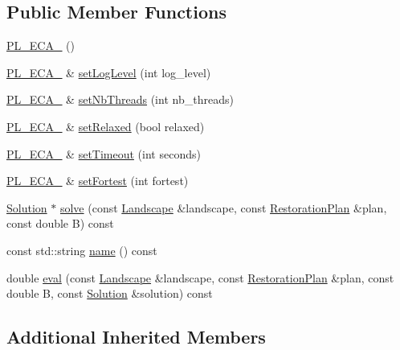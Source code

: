 \subsection*{Public Member Functions}
\begin{DoxyCompactItemize}
\item 
\hyperlink{class_solvers_1_1_p_l___e_c_a__3_a9af5b2a3a8f0df9de16a23781d56066a}{P\+L\+\_\+\+E\+C\+A\+\_} ()
\item 
\hyperlink{class_solvers_1_1_p_l___e_c_a__3}{P\+L\+\_\+\+E\+C\+A\+\_} \& \hyperlink{class_solvers_1_1_p_l___e_c_a__3_a009037ee169b9b0f372a85925274eaba}{set\+Log\+Level} (int log\+\_\+level)
\item 
\hyperlink{class_solvers_1_1_p_l___e_c_a__3}{P\+L\+\_\+\+E\+C\+A\+\_} \& \hyperlink{class_solvers_1_1_p_l___e_c_a__3_a112c187ccdabdc24bb7f9bf670ece7e1}{set\+Nb\+Threads} (int nb\+\_\+threads)
\item 
\hyperlink{class_solvers_1_1_p_l___e_c_a__3}{P\+L\+\_\+\+E\+C\+A\+\_} \& \hyperlink{class_solvers_1_1_p_l___e_c_a__3_af7951a4d24d7d85d2c0dc640fb436d41}{set\+Relaxed} (bool relaxed)
\item 
\hyperlink{class_solvers_1_1_p_l___e_c_a__3}{P\+L\+\_\+\+E\+C\+A\+\_} \& \hyperlink{class_solvers_1_1_p_l___e_c_a__3_a3f39771900d4abb806836b08373c005c}{set\+Timeout} (int seconds)
\item 
\hyperlink{class_solvers_1_1_p_l___e_c_a__3}{P\+L\+\_\+\+E\+C\+A\+\_} \& \hyperlink{class_solvers_1_1_p_l___e_c_a__3_ab4011be3f89d3c26a32486f769365434}{set\+Fortest} (int fortest)
\item 
\hyperlink{class_solution}{Solution} $\ast$ \hyperlink{class_solvers_1_1_p_l___e_c_a__3_ae296efd0061d2fbf478732bc9c280202}{solve} (const \hyperlink{class_landscape}{Landscape} \&landscape, const \hyperlink{class_restoration_plan}{Restoration\+Plan} \&plan, const double B) const
\item 
const std\+::string \hyperlink{class_solvers_1_1_p_l___e_c_a__3_ac265db86ca64eb34ba5370e905686a21}{name} () const
\item 
double \hyperlink{class_solvers_1_1_p_l___e_c_a__3_ae18471edc442194d0e8b786c3eb35f90}{eval} (const \hyperlink{class_landscape}{Landscape} \&landscape, const \hyperlink{class_restoration_plan}{Restoration\+Plan} \&plan, const double B, const \hyperlink{class_solution}{Solution} \&solution) const
\end{DoxyCompactItemize}
\subsection*{Additional Inherited Members}


